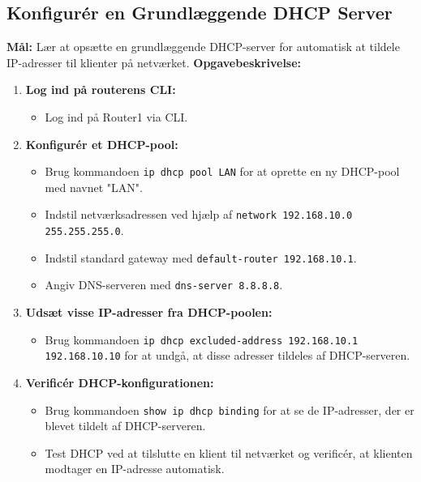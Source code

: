 \subsection{Konfigurér en Grundlæggende DHCP Server}
\textbf{Mål:} Lær at opsætte en grundlæggende DHCP-server for automatisk at tildele IP-adresser til klienter på netværket.
\newline\newline\noindent
\textbf{Opgavebeskrivelse:}
\begin{enumerate}
	\item \textbf{Log ind på routerens CLI:}
	\begin{itemize}
		\item Log ind på Router1 via CLI.
	\end{itemize}
	\item \textbf{Konfigurér et DHCP-pool:}
	\begin{itemize}
		\item Brug kommandoen \texttt{ip dhcp pool LAN} for at oprette en ny DHCP-pool med navnet "LAN".
		\item Indstil netværksadressen ved hjælp af \texttt{network 192.168.10.0 255.255.255.0}.
		\item Indstil standard gateway med \texttt{default-router 192.168.10.1}.
		\item Angiv DNS-serveren med \texttt{dns-server 8.8.8.8}.
	\end{itemize}
	\item \textbf{Udsæt visse IP-adresser fra DHCP-poolen:}
	\begin{itemize}
		\item Brug kommandoen \texttt{ip dhcp excluded-address 192.168.10.1 192.168.10.10} for at undgå, at disse adresser tildeles af DHCP-serveren.
	\end{itemize}
	\item \textbf{Verificér DHCP-konfigurationen:}
	\begin{itemize}
		\item Brug kommandoen \texttt{show ip dhcp binding} for at se de IP-adresser, der er blevet tildelt af DHCP-serveren.
		\item Test DHCP ved at tilslutte en klient til netværket og verificér, at klienten modtager en IP-adresse automatisk.
	\end{itemize}
\end{enumerate}

